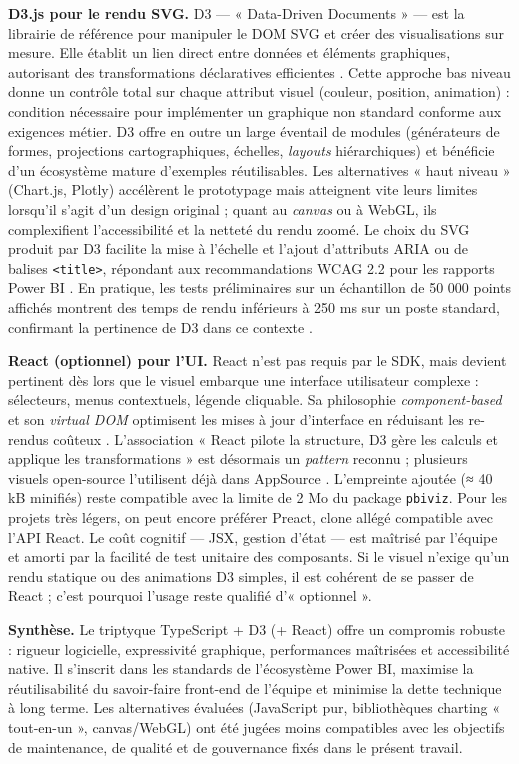 \textbf{D3.js pour le rendu SVG.}
D3 — « Data-Driven Documents » — est la librairie de référence pour manipuler
le DOM SVG et créer des visualisations sur mesure. Elle établit un lien
direct entre données et éléments graphiques, autorisant des
transformations déclaratives efficientes \parencite{Bostock2019}. Cette
approche bas niveau donne un contrôle total sur chaque attribut visuel
(couleur, position, anim­ation) : condition nécessaire pour implémenter un
graphique non standard conforme aux exigences métier. D3 offre en outre un
large éventail de modules (générateurs de formes, projections
cartographiques, échelles, \emph{layouts} hiérarchiques) et bénéficie d’un
écosystème mature d’exemples réutilisables. Les alternatives « haut
niveau » (Chart.js, Plotly) accélèrent le prototypage mais atteignent vite
leurs limites lorsqu’il s’agit d’un design original ; quant au
\emph{canvas} ou à WebGL, ils complexifient l’accessibilité et la netteté
du rendu zoomé. Le choix du SVG produit par D3 facilite la mise à l’échelle
et l’ajout d’attributs ARIA ou de balises \verb|<title>|, répondant aux
recommandations WCAG 2.2 pour les rapports Power BI
\parencite{W3CAccessibility2023}. En pratique, les tests préliminaires sur
un échantillon de 50 000 points affichés montrent des temps de
rendu inférieurs à 250 ms sur un poste standard, confirmant la pertinence
de D3 dans ce contexte \parencite{BenchPBI2025}.

\textbf{React (optionnel) pour l’UI.}
React n’est pas requis par le SDK, mais devient pertinent dès lors que le
visuel embarque une interface utilisateur complexe : sélecteurs, menus
contextuels, légende cliquable. Sa philosophie \emph{component-based} et
son \emph{virtual DOM} optimisent les mises à jour d’interface en
réduisant les re-rendus coûteux \parencite{ReactDocs2024}. L’association
« React pilote la structure, D3 gère les calculs et applique les
transformations » est désormais un \emph{pattern} reconnu ; plusieurs
visuels open-source l’utilisent déjà dans AppSource
\parencite{PowerBIReactD3Sample2024}. L’empreinte ajoutée (≈ 40 kB
minifiés) reste compatible avec la limite de 2 Mo du package \texttt{pbiviz}.
Pour les projets très légers, on peut encore préférer Preact, clone
allégé compatible avec l’API React. Le coût cognitif — JSX, gestion d’état
— est maîtrisé par l’équipe et amorti par la facilité de test unitaire des
composants. Si le visuel n’exige qu’un rendu statique ou des animations
D3 simples, il est cohérent de se passer de React ; c’est pourquoi l’usage
reste qualifié d’« optionnel ».

\textbf{Synthèse.}
Le triptyque TypeScript + D3 (+ React) offre un compromis robuste : rigueur
logicielle, expressivité graphique, performances maîtrisées et
accessibilité native. Il s’inscrit dans les standards de l’écosystème Power
BI, maximise la réutilisabilité du savoir-faire front-end de l’équipe et
minimise la dette technique à long terme. Les alternatives évaluées
(JavaScript pur, bibliothèques charting « tout-en-un », canvas/WebGL) ont
été jugées moins compatibles avec les objectifs de maintenance, de qualité
et de gouvernance fixés dans le présent travail.
